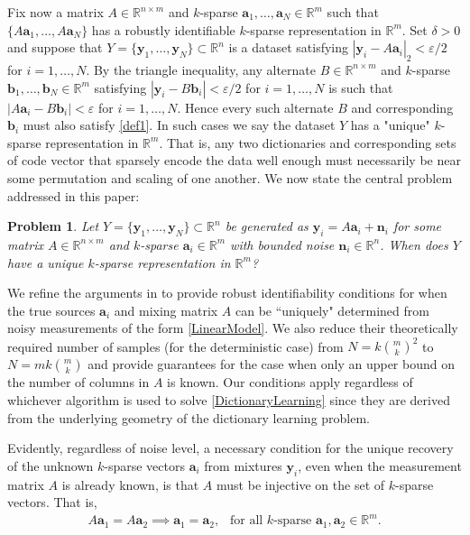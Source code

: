 \documentclass[journal, onecolumn]{IEEEtran}
\newtheorem{problem}{Problem}
\begin{document}
Fix now a matrix $A \in \mathbb{R}^{n \times m}$ and $k$-sparse $\mathbf{a}_1, \ldots, \mathbf{a}_N \in \mathbb{R}^m$ such that $\{A\mathbf{a}_1, \ldots, A\mathbf{a}_N\}$ has a robustly identifiable $k$-sparse representation in $\mathbb{R}^m$. Set $\delta > 0$ and suppose that $Y = \{\mathbf{y}_1, \ldots, \mathbf{y}_N\} \subset \mathbb{R}^n$ is a dataset satisfying $|\mathbf{y}_i - A\mathbf{a}_i|_2 < \varepsilon/2$ for $i = 1, \ldots, N$. By the triangle inequality, any alternate $B \in \mathbb{R}^{n \times m}$ and $k$-sparse $\mathbf{b}_1, \ldots, \mathbf{b}_N \in \mathbb{R}^m$ satisfying $|\mathbf{y}_i - B\mathbf{b}_i| < \varepsilon/2$ for $i = 1, \ldots, N$ is such that $|A\mathbf{a}_i - B\mathbf{b}_i| < \varepsilon$ for $i = 1, \ldots, N$. Hence every such alternate $B$ and corresponding $\mathbf{b}_i$ must also satisfy \eqref{def1}. In such cases we say the dataset $Y$ has a "unique" $k$-sparse representation in $\mathbb{R}^m$. That is, any two dictionaries and corresponding sets of code vector that sparsely encode the data well enough must necessarily be near some permutation and scaling of one another. We now state the central problem addressed in this paper:

\begin{problem}\label{DUTproblem}
Let $Y = \{\mathbf{y}_1, \ldots, \mathbf{y}_N \} \subset \mathbb{R}^n$ be generated as $\mathbf{y}_i = A\mathbf{a}_i  + \mathbf{n}_i$ for some matrix $A \in \mathbb{R}^{n \times m}$ and $k$-sparse $\mathbf{a}_i \in \mathbb{R}^m$ with bounded noise $\mathbf{n}_i \in \mathbb{R}^n$. When does $Y$ have a unique $k$-sparse representation in $\mathbb{R}^m$?
\end{problem}

We refine the arguments in \cite{HS15} to provide robust identifiability conditions for when the true sources $\mathbf{a}_i$ and mixing matrix $A$ can be ``uniquely" determined from noisy measurements of the form \eqref{LinearModel}. We also reduce their theoretically required number of samples (for the deterministic case) from $N=k{m \choose k}^2$ to $N = mk{m \choose k}$ and provide guarantees for the case when only an upper bound on the number of columns in $A$ is known. Our conditions apply regardless of whichever algorithm is used to solve \eqref{DictionaryLearning} since they are derived from the underlying geometry of the dictionary learning problem. 

Evidently, regardless of noise level, a necessary condition for the unique recovery of the unknown $k$-sparse vectors $\mathbf{a}_i$ from mixtures $\mathbf{y}_i$, even when the measurement matrix $A$ is already known, is that $A$ must be injective on the set of $k$-sparse vectors. That is,
\begin{align}\label{SparkCondition}
A\mathbf{a}_1 = A\mathbf{a}_2 \implies \mathbf{a}_1 = \mathbf{a}_2, \ \ \text{ for all $k$-sparse } \mathbf{a}_1, \mathbf{a}_2 \in \mathbb{R}^m.
\end{align}
\end{document}
